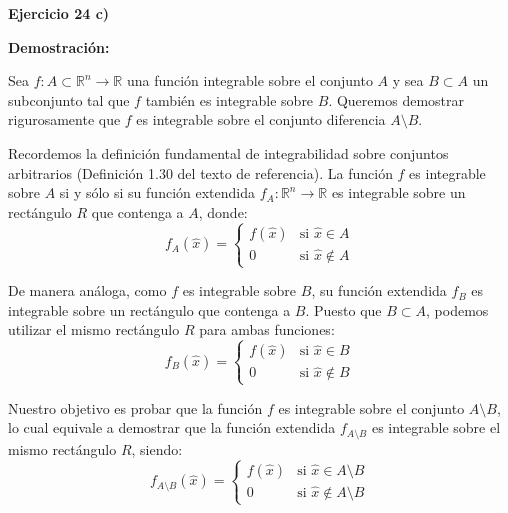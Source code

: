 \documentclass[11pt,letterpaper]{article}
\begin{document}
\textbf{Ejercicio 24 c)}

\textbf{Demostración:}

Sea $f: A \subset \mathbb{R}^n \rightarrow \mathbb{R}$ una función integrable sobre el conjunto $A$ y sea $B \subset A$ un subconjunto tal que $f$ también es integrable sobre $B$. Queremos demostrar rigurosamente que $f$ es integrable sobre el conjunto diferencia $A \setminus B$.

Recordemos la definición fundamental de integrabilidad sobre conjuntos arbitrarios (Definición 1.30 del texto de referencia). La función $f$ es integrable sobre $A$ si y sólo si su función extendida $f_A: \mathbb{R}^n \rightarrow \mathbb{R}$ es integrable sobre un rectángulo $R$ que contenga a $A$, donde:
\begin{equation*}
f_A(\hat{x}) = 
\begin{cases} 
f(\hat{x}) & \text{si } \hat{x} \in A \\ 
0 & \text{si } \hat{x} \notin A 
\end{cases}
\end{equation*}

De manera análoga, como $f$ es integrable sobre $B$, su función extendida $f_B$ es integrable sobre un rectángulo que contenga a $B$. Puesto que $B \subset A$, podemos utilizar el mismo rectángulo $R$ para ambas funciones:
\begin{equation*}
f_B(\hat{x}) = 
\begin{cases} 
f(\hat{x}) & \text{si } \hat{x} \in B \\ 
0 & \text{si } \hat{x} \notin B 
\end{cases}
\end{equation*}

Nuestro objetivo es probar que la función $f$ es integrable sobre el conjunto $A \setminus B$, lo cual equivale a demostrar que la función extendida $f_{A \setminus B}$ es integrable sobre el mismo rectángulo $R$, siendo:
\begin{equation*}
f_{A \setminus B}(\hat{x}) = 
\begin{cases} 
f(\hat{x}) & \text{si } \hat{x} \in A \setminus B \\ 
0 & \text{si } \hat{x} \notin A \setminus B 
\end{cases}
\end{equation*}
\end{document}
